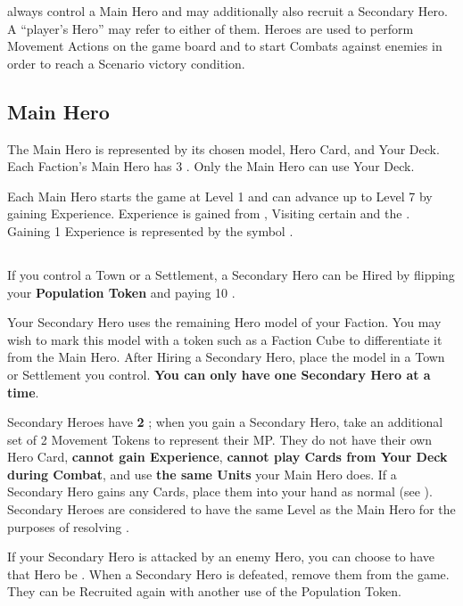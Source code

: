 
\begin{multicols*}{2}

 always control a Main Hero and may additionally also recruit a Secondary Hero.
A ``player's Hero'' may refer to either of them.
Heroes are used to perform Movement Actions on the game board and to start Combats against enemies in order to reach a Scenario victory condition.

\subsection*{Main Hero}
The Main Hero is represented by its chosen model, Hero Card, and Your Deck.
Each Faction's Main Hero has 3 .
Only the Main Hero can use Your Deck.\par
Each Main Hero starts the game at Level 1 and can advance up to Level 7 by gaining Experience.
Experience is gained from , Visiting certain  and the .
Gaining 1 Experience is represented by the symbol .

\subsection*{}
If you control a Town or a Settlement, a Secondary Hero can be Hired by flipping your \textbf{Population Token} and paying 10 .\par
{}\par
Your Secondary Hero uses the remaining Hero model of your Faction.
You may wish to mark this model with a token such as a Faction Cube to differentiate it from the Main Hero.
After Hiring a Secondary Hero, place the model in a Town or Settlement you control.
\textbf{You can only have one Secondary Hero at a time}.\par
Secondary Heroes have \textbf{2 }; when you gain a Secondary Hero, take an additional set of 2 Movement Tokens to represent their MP.
They do not have their own Hero Card, \textbf{cannot gain Experience}, \textbf{cannot play Cards from Your Deck during Combat}, and use \textbf{the same Units} your Main Hero does.
If a Secondary Hero gains any Cards, place them into your hand as normal (see ).
Secondary Heroes are considered to have the same Level as the Main Hero for the purposes of resolving .\par
If your Secondary Hero is attacked by an enemy Hero, you can choose to have that Hero be .
When a Secondary Hero is defeated, remove them from the game.
They can be Recruited again with another use of the Population Token.\par


\end{multicols*}
